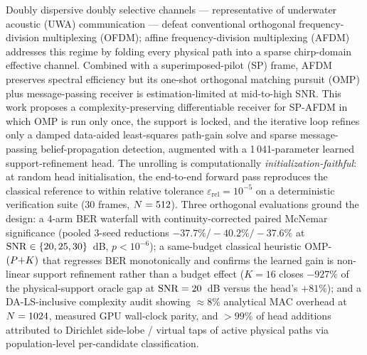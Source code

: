 Doubly dispersive doubly selective channels --- representative of
underwater acoustic (UWA) communication --- defeat conventional
orthogonal frequency-division multiplexing (OFDM); affine
frequency-division multiplexing (AFDM) addresses this regime by folding
every physical path into a sparse chirp-domain effective channel.
Combined with a superimposed-pilot (SP) frame, AFDM preserves spectral
efficiency but its one-shot orthogonal matching pursuit (OMP) plus
message-passing receiver is estimation-limited at mid-to-high SNR. This
work proposes a complexity-preserving differentiable receiver for
SP-AFDM in which OMP is run only once, the support is locked, and the
iterative loop refines only a damped data-aided least-squares path-gain
solve and sparse message-passing belief-propagation detection,
augmented with a 1\,041-parameter learned support-refinement head. The
unrolling is computationally \emph{initialization-faithful}: at random
head initialisation, the end-to-end forward pass reproduces the
classical reference to within relative tolerance $\varepsilon_\text{rel}=10^{-5}$
on a deterministic verification suite (30 frames, $N=512$). Three orthogonal evaluations
ground the design: a 4-arm BER waterfall with continuity-corrected
paired McNemar significance (pooled 3-seed reductions $-37.7\%/-40.2\%/-37.6\%$
at $\mathrm{SNR}\in\{20,25,30\}$~dB, $p<10^{-6}$); a same-budget classical
heuristic OMP-$(P{+}K)$ that regresses BER monotonically and
confirms the learned gain is non-linear support refinement rather than
a budget effect ($K{=}16$ closes $-927\%$ of the physical-support
oracle gap at $\mathrm{SNR}=20$~dB versus the head's $+81\%$); and a
DA-LS-inclusive complexity audit showing $\approx 8\%$ analytical
MAC overhead at $N=1024$, measured GPU wall-clock parity, and
$>99\%$ of head additions attributed to Dirichlet side-lobe / virtual
taps of active physical paths via population-level per-candidate
classification.
